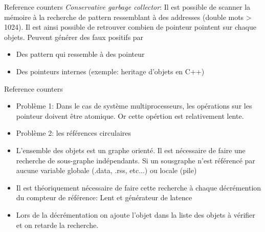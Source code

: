 \begin{frame}[fragile=singleslide]{Reference counters}
  \emph{Conservative garbage collector}: Il est possible de scanner la
  mémoire  à  la recherche  de  pattern  ressemblant  à des  addresses
  (double mots > 1024).  Il est ainsi possible de retrouver combien de
  pointeur  pointent  sur  chaque  objets. Peuvent  générer  des  faux
  positifs par
  \begin{itemize}
  \item Des pattern qui ressemble à des pointeur
  \item Des pointeurs internes (exemple: heritage d'objets en C++)
  \end{itemize}
\end{frame}

\begin{frame}[fragile=singleslide]{Reference counters}
  \begin{itemize}
  \item  Problème 1:  Dans  le cas  de  système multiprocesseurs,  les
    opérations  sur  les pointeur  doivent  être  atomique.  Or  cette
    opértion est relativement lente.
  \item Problème 2: les références circulaires
  \item L'ensemble des objets est un graphe orienté. Il est nécessaire
    de  faire  une  recherche  de  sous-graphe  indépendants.   Si  un
    sousgraphe  n'est référencé  par aucune  variable  globale (.data,
    .rss, etc...) ou locale (pile)
  \item  Il est théoriquement  nécessaire de  faire cette  recherche à
    chaque décrémention  du compteur de référence:  Lent et générateur
    de latence
  \item Lors de la décrémentation  on ajoute l'objet dans la liste des
    objets à vérifier et  on retarde la recherche.
  \end{itemize}
\end{frame}

